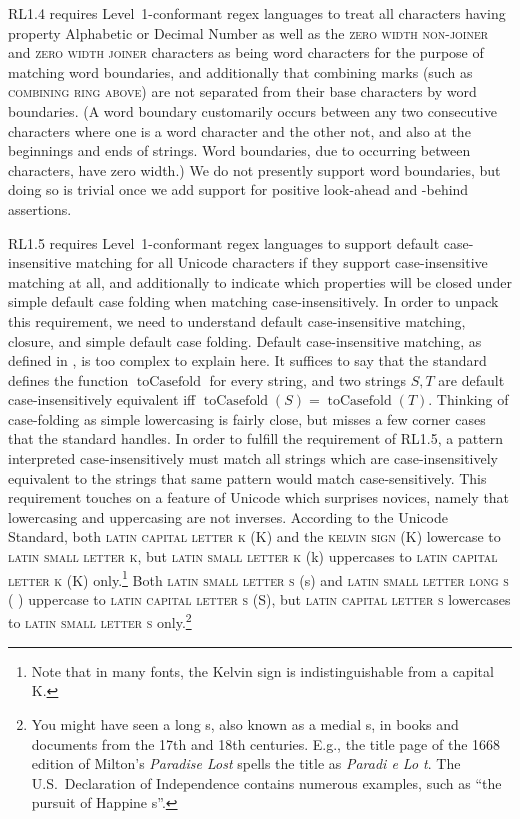 \documentclass[5p,final,number,sort&compress]{elsarticle}
\begin{document}
RL1.4 requires Level~1-conformant regex languages to treat all characters having property Alphabetic or Decimal Number as well as the \textsc{zero width non-joiner} and \textsc{zero width joiner} characters as being word characters for the purpose of matching word boundaries, and additionally that combining marks (such as \textsc{combining ring above}) are not separated from their base characters by word boundaries. (A word boundary customarily occurs between any two consecutive characters where one is a word character and the other not, and also at the beginnings and ends of strings. Word boundaries, due to occurring between characters, have zero width.) We do not presently support word boundaries, but doing so is trivial once we add support for positive look-ahead and -behind assertions.

RL1.5 requires Level~1-conformant regex languages to support default case-insensitive matching for all Unicode characters if they support case-insensitive matching at all, and additionally to indicate which properties will be closed under simple default case folding when matching case-insensitively. In order to unpack this requirement, we need to understand default case-insensitive matching, closure, and simple default case folding. Default case-insensitive matching, as defined in \citep[\S 3.1.3]{ustd62}, is too complex to explain here. It suffices to say that the standard defines the function $\operatorname{toCasefold}$ for every string, and two strings $S,T$ are default case-insensitively equivalent iff $\operatorname{toCasefold}(S) = \operatorname{toCasefold}(T)$. Thinking of case-folding as simple lowercasing is fairly close, but misses a few corner cases that the standard handles. In order to fulfill the requirement of RL1.5, a pattern interpreted case-insensitively must match all strings which are case-insensitively equivalent to the strings that same pattern would match case-sensitively. This requirement touches on a feature of Unicode which surprises novices, namely that lowercasing and uppercasing are not inverses. According to the Unicode Standard, both \textsc{latin capital letter k} (K) and the \textsc{kelvin sign} (K) lowercase to \textsc{latin small letter k}, but \textsc{latin small letter k} (k) uppercases to \textsc{latin capital letter k} (K) only.\footnote{Note that in many fonts, the Kelvin sign is indistinguishable from a capital K.} Both \textsc{latin small letter s} (s) and \textsc{latin small letter long s} (
) uppercase to \textsc{latin capital letter s} (S), but \textsc{latin capital letter s} lowercases to \textsc{latin small letter s} only.\footnote{You might have seen a long s, also known as a medial s, in books and documents from the 17th and 18th centuries. E.g., the title page of the 1668 edition of Milton's \emph{Paradise Lost} spells the title as \emph{Paradi
e Lo
t}. The U.S.\ Declaration of Independence contains numerous examples, such as ``the pursuit of Happine
s''. }
\end{document}
